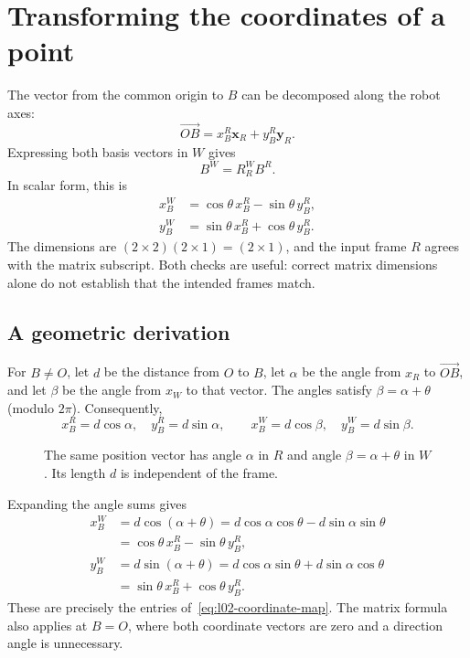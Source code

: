 \section{Transforming the coordinates of a point}
The vector from the common origin to $B$ can be decomposed along the robot axes:
\[
 \overrightarrow{OB}=x_B^R\boldsymbol{x}_R+y_B^R\boldsymbol{y}_R.
\]
Expressing both basis vectors in $W$ gives
\begin{equation}
 \boxed{B^W=R_R^W B^R.}
 \label{eq:l02-coordinate-map}
\end{equation}
In scalar form, this is
\begin{align}
 x_B^W&=\cos\theta\,x_B^R-\sin\theta\,y_B^R,\\
 y_B^W&=\sin\theta\,x_B^R+\cos\theta\,y_B^R.
\end{align}
The dimensions are $(2\times2)(2\times1)=(2\times1)$, and the input frame
$R$ agrees with the matrix subscript. Both checks are useful: correct matrix
dimensions alone do not establish that the intended frames match.

\subsection{A geometric derivation}
For $B\ne O$, let $d$ be the distance from $O$ to $B$, let $\alpha$ be the
angle from $x_R$ to $\overrightarrow{OB}$, and let $\beta$ be the angle from
$x_W$ to that vector. The angles satisfy $\beta=\alpha+\theta$ (modulo $2\pi$).
Consequently,
\[
 x_B^R=d\cos\alpha,\quad y_B^R=d\sin\alpha,\qquad
 x_B^W=d\cos\beta,\quad y_B^W=d\sin\beta.
\]

\begin{figure}[htbp]
\centering
\caption{The same position vector has angle $\alpha$ in $R$ and angle
$\beta=\alpha+\theta$ in $W$. Its length $d$ is independent of the frame.}
\label{fig:l02-angles}
\end{figure}

Expanding the angle sums gives
\begin{align*}
 x_B^W&=d\cos(\alpha+\theta)
 =d\cos\alpha\cos\theta-d\sin\alpha\sin\theta\\
 &=\cos\theta\,x_B^R-\sin\theta\,y_B^R,\\
 y_B^W&=d\sin(\alpha+\theta)
 =d\cos\alpha\sin\theta+d\sin\alpha\cos\theta\\
 &=\sin\theta\,x_B^R+\cos\theta\,y_B^R.
\end{align*}
These are precisely the entries of~\eqref{eq:l02-coordinate-map}. The matrix
formula also applies at $B=O$, where both coordinate vectors are zero and a
direction angle is unnecessary.

